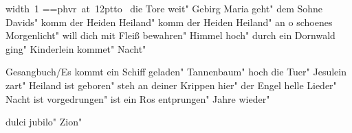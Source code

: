 \ifx\mxversion\undefined
  
  
  
  
\fi

%
\newbox\datebox%
\hbox{\pdfximage width 1\pdfrefximage\pdflastximage}
\setbox\datebox=\hbox{\font\datefont=phvr at 12pt\datefont{}\hbox to }%
\ht\datebox=0pt%
\box\datebox%
\vfill\eject
\tableofcontents
\normalmusicsize
 die Tore weit"
 Gebirg Maria geht"
 dem Sohne Davids"
 komm der Heiden Heiland"
 komm der Heiden Heiland"
 an o schoenes Morgenlicht"
 will dich mit Fleiß bewahren"
 Himmel hoch"
 durch ein Dornwald ging"
 Kinderlein kommet"
 Nacht"

 Gesangbuch/Es kommt ein Schiff geladen"
 Tannenbaum"
 hoch die Tuer"
 Jesulein zart"
 Heiland ist geboren"
 steh an deiner Krippen hier"
 der Engel helle Lieder"
 Nacht ist vorgedrungen"
 ist ein Ros entprungen"
 Jahre wieder"

\makeatletter
{}
\makeatother
 dulci jubilo"
\makeatletter
{}
\makeatother
 Zion"
\bookbye